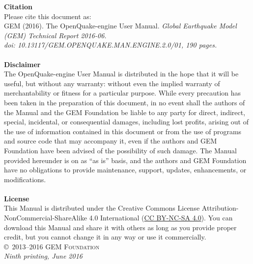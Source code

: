 \documentclass[11pt,fleqn]{book} %
\begin{document}
\noindent
   {\textbf{Citation}} \hfill \\
   Please cite this document as: \hfill \\
   GEM (2016). The OpenQuake-engine User Manual.
   \textit{Global Earthquake Model (GEM) Technical Report 2016-06.\\
   doi: 10.13117/GEM.OPENQUAKE.MAN.ENGINE.2.0/01, 190 pages.} \hfill \\
\noindent \hfill\\
\noindent
   {\bf{Disclaimer}} \hfill \\
   The OpenQuake-engine User Manual is distributed in the hope that it will be
   useful, but without any warranty: without even the implied warranty of
   merchantability or fitness for a particular purpose. While every precaution
   has been taken in the preparation of this document, in no event shall the
   authors of the Manual and the GEM Foundation be liable to any party for
   direct, indirect, special, incidental, or consequential damages, including
   lost profits, arising out of the use of information contained in this
   document or from the use of programs and source code that may accompany it,
   even if the authors and GEM Foundation have been advised of the possibility
   of such damage. The Manual provided hereunder is on as ``as is'' basis, and
   the  authors and GEM Foundation have no obligations to provide maintenance,
   support, updates, enhancements, or modifications. \hfill \\
\noindent \hfill\\
\noindent
   {\bf{License}} \hfill \\
   This Manual is distributed under the Creative Commons License  Attribution-
   NonCommercial-ShareAlike 4.0 International
   (\href{http://creativecommons.org/licenses/by-nc-sa/4.0/} {CC BY-NC-SA
   4.0}). You can download this Manual and share it with others as long as you
   provide proper credit, but you cannot change it in any way or use it
   commercially.\hfill \\

\noindent \copyright\ \textsc{2013--2016 GEM Foundation}\\
\noindent \textit{Ninth printing, June 2016} %


\pagestyle{empty} %
\tableofcontents %
\cleardoublepage %
\pagestyle{fancy} %
\end{document}
